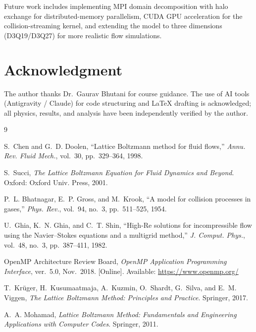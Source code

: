 \documentclass[journal]{IEEEtran}
\begin{document}
Future work includes implementing MPI domain decomposition with
halo exchange for distributed-memory parallelism, CUDA GPU
acceleration for the collision-streaming kernel, and extending the
model to three dimensions (D3Q19/D3Q27) for more realistic flow
simulations.

\section*{Acknowledgment}
The author thanks Dr.~Gaurav Bhutani for course guidance.  The use
of AI tools (Antigravity / Claude) for code structuring and \LaTeX{}
drafting is acknowledged; all physics, results, and analysis have
been independently verified by the author.

\begin{thebibliography}{9}

S.~Chen and G.~D. Doolen,
``Lattice Boltzmann method for fluid flows,''
\emph{Annu. Rev. Fluid Mech.}, vol.~30, pp.~329--364, 1998.

S.~Succi,
\emph{The Lattice Boltzmann Equation for Fluid Dynamics and Beyond}.
Oxford: Oxford Univ. Press, 2001.

P.~L. Bhatnagar, E.~P. Gross, and M.~Krook,
``A model for collision processes in gases,''
\emph{Phys. Rev.}, vol.~94, no.~3, pp.~511--525, 1954.

U.~Ghia, K.~N. Ghia, and C.~T. Shin,
``High-Re solutions for incompressible flow using the Navier--Stokes
equations and a multigrid method,''
\emph{J. Comput. Phys.}, vol.~48, no.~3, pp.~387--411, 1982.

OpenMP Architecture Review Board,
\emph{OpenMP Application Programming Interface}, ver.~5.0, Nov.~2018.
[Online]. Available: \url{https://www.openmp.org/}

T.~Kr\"{u}ger, H.~Kusumaatmaja, A.~Kuzmin, O.~Shardt, G.~Silva,
and E.~M. Viggen,
\emph{The Lattice Boltzmann Method: Principles and Practice}.
Springer, 2017.

A.~A. Mohamad,
\emph{Lattice Boltzmann Method: Fundamentals and Engineering
Applications with Computer Codes}.
Springer, 2011.

\end{thebibliography}
\end{document}
